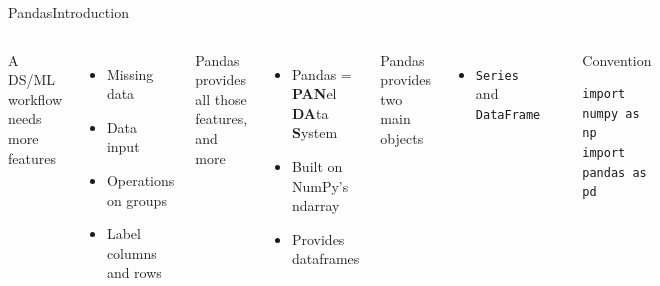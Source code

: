 \documentclass[10pt,compress]{beamer} %
\begin{document}
\begin{frame}[fragile]{Pandas}{Introduction}
	\begin{columns}
		A DS/ML workflow needs more features
		\begin{itemize}
			\item Missing data
			\item Data input
			\item Operations on groups
			\item Label columns and rows
		\end{itemize}
		Pandas provides all those features, and more
		\begin{itemize}
			\item Pandas = \textbf{PAN}el \textbf{DA}ta \textbf{S}ystem
			\item Built on NumPy's ndarray
			\item Provides \alert{dataframes}
		\end{itemize}
		Pandas provides two main objects
		\begin{itemize}
			\item \texttt{Series} and \texttt{DataFrame}
		\end{itemize}

		\includegraphics[width=\textwidth]{figs/pandas.png}	

		\begin{block}{\footnotesize{Convention}}
		\vspace{-0.2cm} 
			\begin{lstlisting}
import numpy as np
import pandas as pd
\end{lstlisting}
\vspace{-0.2cm} 
\end{block}

	\end{columns}
\end{frame}
\end{document}
